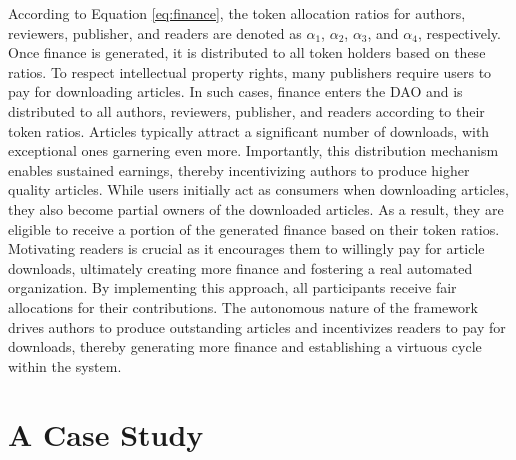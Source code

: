 \documentclass[lettersize,journal]{IEEEtran}
\begin{document}
According to Equation \ref{eq:finance}, the token allocation ratios for authors, reviewers, publisher, and readers are denoted as $\alpha_1$, $\alpha_2$, $\alpha_3$, and $\alpha_4$, respectively. Once finance is generated, it is distributed to all token holders based on these ratios. 
To respect intellectual property rights, many publishers require users to pay for downloading articles. In such cases, finance enters the DAO and is distributed to all authors, reviewers, publisher, and readers according to their token ratios. Articles typically attract a significant number of downloads, with exceptional ones garnering even more. Importantly, this distribution mechanism enables sustained earnings, thereby incentivizing authors to produce higher quality articles. 
While users initially act as consumers when downloading articles, they also become partial owners of the downloaded articles. As a result, they are eligible to receive a portion of the generated finance based on their token ratios. Motivating readers is crucial as it encourages them to willingly pay for article downloads, ultimately creating more finance and fostering a real automated organization. 
By implementing this approach, all participants receive fair allocations for their contributions. The autonomous nature of the framework drives authors to produce outstanding articles and incentivizes readers to pay for downloads, thereby generating more finance and establishing a virtuous cycle within the system.






\section{A Case Study \label{sec:performance}}
\end{document}
